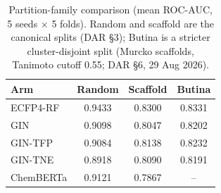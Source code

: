 \begin{table}[htbp]
  \centering
  \caption{Partition-family comparison (mean ROC-AUC, 5 seeds $\times$ 5 folds).
  Random and scaffold are the canonical splits (DAR \S3); Butina is a stricter
  cluster-disjoint split (Murcko scaffolds, Tanimoto cutoff 0.55; DAR \S6, 29 Aug 2026).}
  \label{tab:butina-partition}
  \begin{tabular}{lccc}
    \toprule
    Arm & Random & Scaffold & Butina \\
    \midrule
    ECFP4-RF & 0.9433 & 0.8300 & 0.8331 \\
    GIN & 0.9098 & 0.8047 & 0.8202 \\
    GIN-TFP & 0.9084 & 0.8138 & 0.8232 \\
    GIN-TNE & 0.8918 & 0.8090 & 0.8191 \\
    ChemBERTa & 0.9121 & 0.7867 & -- \\
    \bottomrule
  \end{tabular}
\end{table}
